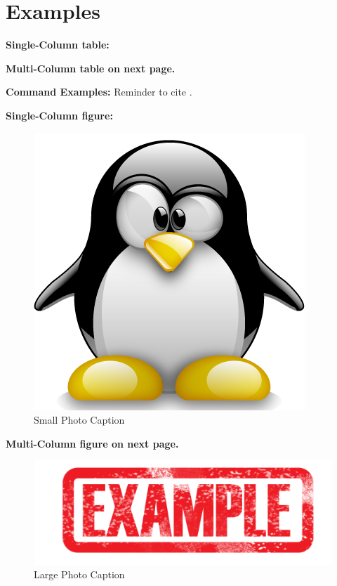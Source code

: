 \section{Examples}\label{sec:examples}

\textbf{Single-Column table:}
 \hfill \break 

\textbf{Multi-Column table on next page.}
 \hfill \break 

\textbf{Command Examples:} \hfill \break 
{} \hfill \break 
{} \hfill \break 
{} \hfill \break 
{} \hfill \break 
Reminder to cite \needcite. \hfill \break 

\textbf{Single-Column figure:} \hfill \break 
\begin{figure}[h]
  \centering
  \includegraphics[scale=0.2]{_graphics/smExample.png}
  \caption{Small Photo Caption\footnotemark}
  \label{fig:smPhoto}
\end{figure}



\textbf{Multi-Column figure on next page.} \hfill \break 
\begin{figure}[h]
  \centering
  \includegraphics[width=\textwidth]{_graphics/lgExample.png}
  \caption{Large Photo Caption}
  \label{fig:lgPhoto}
\end{figure}


